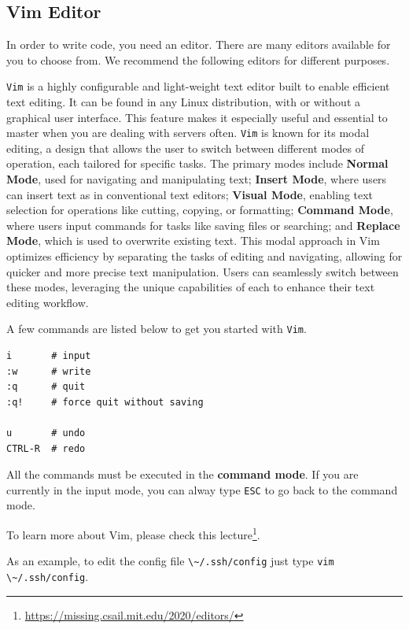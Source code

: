 \documentclass[
  notoc %
]{tufte-book}
\DeclareRobustCommand{\href}[2]{#2\footnote{\url{#1}}}
\newcommand{\passthrough}[1]{#1}
\begin{document}
\hypertarget{sec:editor}{%
\subsection{Vim Editor}\label{sec:editor}}

In order to write code, you need an editor. There are many editors
available for you to choose from. We recommend the following editors for
different purposes.

\passthrough{\lstinline!Vim!} is a highly configurable and light-weight
text editor built to enable efficient text editing. It can be found in
any Linux distribution, with or without a graphical user interface. This
feature makes it especially useful and essential to master when you are
dealing with servers often. \passthrough{\lstinline!Vim!} is known for
its modal editing, a design that allows the user to switch between
different modes of operation, each tailored for specific tasks. The
primary modes include \textbf{Normal Mode}, used for navigating and
manipulating text; \textbf{Insert Mode}, where users can insert text as
in conventional text editors; \textbf{Visual Mode}, enabling text
selection for operations like cutting, copying, or formatting;
\textbf{Command Mode}, where users input commands for tasks like saving
files or searching; and \textbf{Replace Mode}, which is used to
overwrite existing text. This modal approach in Vim optimizes efficiency
by separating the tasks of editing and navigating, allowing for quicker
and more precise text manipulation. Users can seamlessly switch between
these modes, leveraging the unique capabilities of each to enhance their
text editing workflow.

A few commands are listed below to get you started with
\passthrough{\lstinline!Vim!}.

\begin{lstlisting}
i       # input
:w      # write
:q      # quit
:q!     # force quit without saving

u       # undo
CTRL-R  # redo
\end{lstlisting}

All the commands must be executed in the \textbf{command mode}. If you
are currently in the input mode, you can alway type
\passthrough{\lstinline!ESC!} to go back to the command mode.

To learn more about Vim, please check this
\href{https://missing.csail.mit.edu/2020/editors/}{lecture}.

As an example, to edit the config file
\passthrough{\lstinline!\~/.ssh/config!} just type
\passthrough{\lstinline!vim \~/.ssh/config!}.
\end{document}
